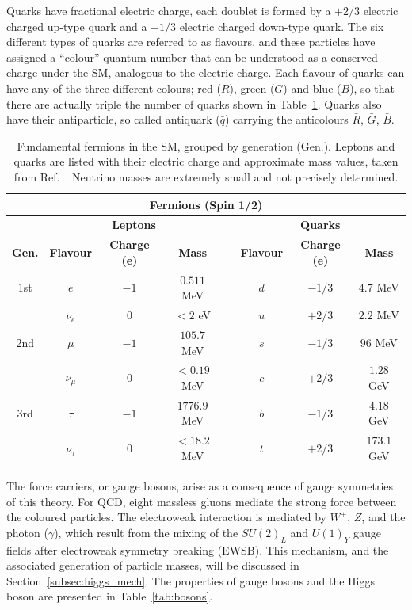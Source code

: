 Quarks have fractional electric charge, each doublet is formed by a $+2/3$ electric charged up-type quark and a $-1/3$ electric charged down-type quark. The six different types of quarks are referred to as flavours, and these particles have assigned a ``colour'' quantum number that can be understood as a conserved charge under the SM, analogous to the electric charge. Each flavour of quarks can have any of the three different colours;
red ($R$), green ($G$) and blue ($B$), so that there are actually triple the number of quarks
shown in Table~\ref{tab:fermions}. Quarks also have their antiparticle, so called antiquark ($\bar{q}$) carrying
the anticolours $\bar{R}$, $\bar{G}$, $\bar{B}$.
\begin{table}[htbp]
\centering
\caption{Fundamental fermions in the SM, grouped by generation (Gen.). Leptons and quarks are listed with their electric charge and approximate mass values, taken from Ref.~\cite{ParticleDataGroup}. Neutrino masses are extremely small and not precisely determined.}
\small %
\renewcommand{\arraystretch}{1.2} %
\setlength{\tabcolsep}{4pt} %
\begin{tabular}{cccccccc}
\multicolumn{8}{c}{\textbf{Fermions (Spin 1/2)}} \\
\toprule
 & \multicolumn{3}{c}{\textbf{Leptons}} & & \multicolumn{3}{c}{\textbf{Quarks}} \\
\midrule
\textbf{Gen.} & \textbf{Flavour} & \textbf{Charge (e)} & \textbf{Mass} & 
              & \textbf{Flavour} & \textbf{Charge (e)} & \textbf{Mass} \\
\midrule
1st & $e$ & $-1$ & $0.511$ MeV & & $d$ & $-1/3$ & $4.7$ MeV \\
    & $\nu_e$ & $0$ & $<2$ eV & & $u$ & $+2/3$ & $2.2$ MeV \\
2nd & $\mu$ & $-1$ & $105.7$ MeV & & $s$ & $-1/3$ & $96$ MeV \\
     & $\nu_\mu$ & $0$ & $<0.19$ MeV & & $c$ & $+2/3$ & $1.28$ GeV \\
3rd & $\tau$ & $-1$ & $1776.9$ MeV & & $b$ & $-1/3$ & $4.18$ GeV \\
     & $\nu_\tau$ & $0$ & $<18.2$ MeV & & $t$ & $+2/3$ & $173.1$ GeV \\
\bottomrule
\end{tabular}
\label{tab:fermions}
\end{table}
The force carriers, or gauge bosons, arise as a consequence of gauge symmetries of this theory. For QCD, eight massless gluons mediate the strong force between the coloured particles. The electroweak interaction is mediated by $W^\pm$, $Z$, and the photon ($\gamma$), which result from the mixing of the $SU(2)_L$ and $U(1)_Y$ gauge fields after electroweak symmetry breaking (EWSB). This mechanism, and the associated generation of particle masses, will be discussed in Section~\ref{subsec:higgs_mech}. The properties of gauge bosons and the Higgs boson are presented in Table~\ref{tab:bosons}.

